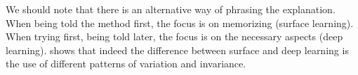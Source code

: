 We should note that there is an alternative way of phrasing the explanation.
When being told the method first, the focus is on memorizing (surface 
learning).
When trying first, being told later, the focus is on the necessary aspects 
(deep learning\label{DeepLearning}).
\Textcite[Ch.~5]{NecessaryConditionsOfLearning} shows that indeed the 
difference between surface and deep learning is the use of different patterns 
of variation and invariance.


